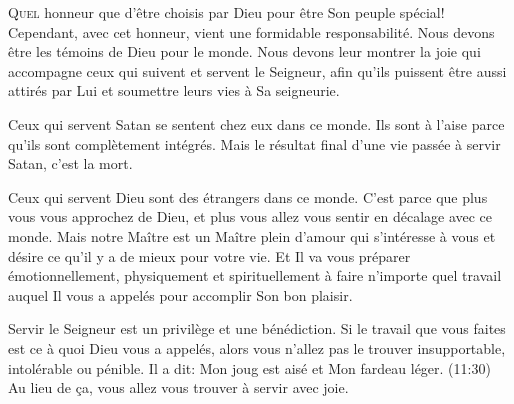 \dvrule







\lettrine{Q}{uel} honneur que d'être choisis par Dieu
 pour être Son peuple spécial!
 Cependant, avec cet honneur, vient une formidable responsabilité.
 Nous devons être les témoins de Dieu pour le monde.
 Nous devons leur montrer la joie qui accompagne ceux qui suivent
 et servent le Seigneur, afin qu'ils puissent être aussi attirés par Lui
 et soumettre leurs vies à Sa seigneurie. 


Ceux qui servent Satan se sentent chez eux dans ce monde.
 Ils sont à l'aise parce qu'ils sont complètement intégrés.
 Mais le résultat final d'une vie passée à servir Satan, c'est la mort.

Ceux qui servent Dieu sont des étrangers dans ce monde.
 C'est parce que plus vous vous approchez de Dieu,
 et plus vous allez vous sentir en décalage avec ce monde.
 Mais notre Maître est un Maître plein d'amour qui s'intéresse à vous
 et désire ce qu'il y a de mieux pour votre vie.
 Et Il va vous préparer émotionnellement, physiquement et spirituellement
 à faire n'importe quel travail auquel Il vous a appelés
 pour accomplir Son bon plaisir.

Servir le Seigneur est un privilège et une bénédiction.
 Si le travail que vous faites est ce à quoi Dieu vous a appelés,
 alors vous n'allez pas le trouver insupportable, intolérable ou pénible.
 Il a dit: \Og Mon joug est aisé et Mon fardeau léger. \Fg{}
 (11:30)
 Au lieu de \c{c}a, vous allez vous trouver à servir avec joie. 

